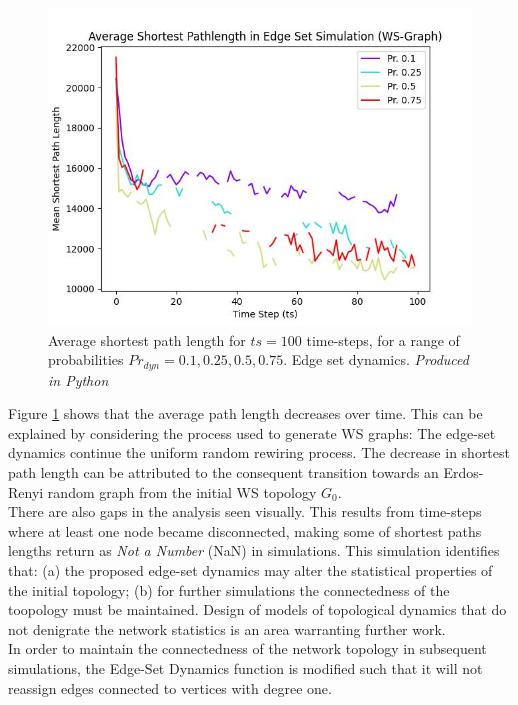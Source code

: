 \documentclass[
	a4paper, %
	10pt, %
	unnumberedsections, %
	twoside, %
]{LTJournalArticle}
\begin{document}
\begin{figure}[H]
	\includegraphics[width=\linewidth]{Figures/esd/lengths.jpg}
	\caption{Average shortest path length for \(ts = 100\) time-steps, for a range of probabilities \(Pr_{dyn} = 0.1, 0.25, 0.5, 0.75\). Edge set dynamics. \emph{Produced in Python}}
	\label{fig:esd_lengths}
\end{figure}

Figure \ref{fig:esd_lengths} shows that the average path length decreases over time. This can be explained by considering the process used to generate WS graphs: The edge-set dynamics continue the uniform random rewiring process. The decrease in shortest path length can be attributed to the consequent transition towards an Erdos-Renyi random graph from the initial WS topology \(G_{0}\). \\

There are also gaps in the analysis seen visually. This results from time-steps where at least one node became disconnected, making some of shortest paths lengths return as \emph{Not a Number} (NaN) in simulations. This simulation identifies that: (a) the proposed edge-set dynamics may alter the statistical properties of the initial topology; (b) for further simulations the connectedness of the toopology must be maintained.  Design of models of topological dynamics that do not denigrate the network statistics is an area warranting further work. \\

In order to maintain the connectedness of the network topology in subsequent simulations, the Edge-Set Dynamics function is modified such that it will not reassign edges connected to vertices with degree one.\\
\end{document}
